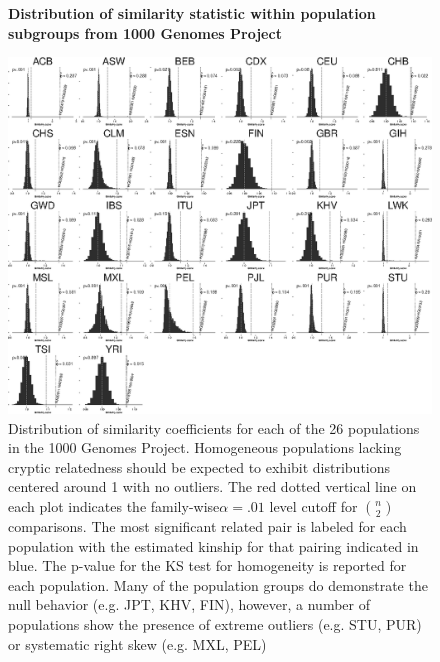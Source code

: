 \begin{figure}
\center\textbf{Distribution of similarity statistic within population subgroups
from 1000 Genomes Project}

\includegraphics[]{./figures/figure1_bw.eps}
\caption[Distribution of similarity coefficients in the 1000 Genomes Project]{Distribution of similarity coefficients for each of the 26 populations
in the 1000 Genomes Project. Homogeneous populations lacking cryptic
relatedness should be expected to exhibit distributions centered around
1 with no outliers. The red dotted vertical line on each plot indicates
the family-wise$\alpha=.01$ level cutoff for ${n \choose 2}$ comparisons.
The most significant related pair is labeled for each population with
the estimated kinship for that pairing indicated in blue. The p-value
for the KS test for homogeneity is reported for each population. Many
of the population groups do demonstrate the null behavior (e.g. JPT,
KHV, FIN), however, a number of populations show the presence of extreme
outliers (e.g. STU, PUR) or systematic right skew (e.g. MXL, PEL)}
\label{fig: All s plots}
\end{figure}

